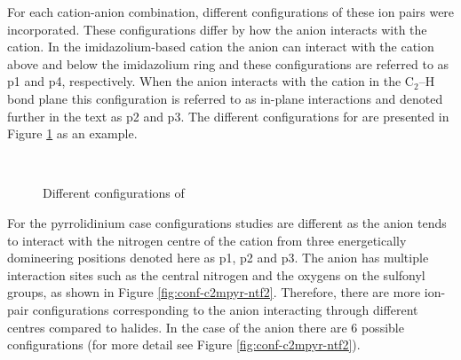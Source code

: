 For each cation-anion combination, different configurations of these ion pairs were incorporated. 
These configurations differ by how the anion interacts with the cation. 
In the imidazolium-based cation  the anion can interact with the cation above and below the imidazolium ring and these configurations are referred to as p1 and p4, respectively.
When the anion interacts with the cation in the $\text{C}_2\text{--H}$ bond plane this configuration is referred to as in-plane interactions and denoted further in the text as p2 and p3.
The different configurations for  are presented in Figure
\protect\ref{fig:conf-c3mim-br}
as an example. 


\begin{figure}
    \centering
    \mbox{
    }
    \mbox{
    }                                 
    \caption{Different configurations of \protect{} \label{fig:conf-c3mim-br}}
\end{figure}

For the pyrrolidinium case configurations studies are different as the anion tends to interact with the nitrogen centre of the cation from three energetically domineering positions denoted here as p1, p2 and p3.
\cite{Izgorodina2014a}
The \ntf anion has multiple interaction sites such as the central nitrogen and the oxygens on the sulfonyl groups, as shown in Figure \ref{fig:conf-c2mpyr-ntf2}.
Therefore, there are more ion-pair configurations corresponding to the anion interacting through different centres compared to halides.
In the case of the \ntf anion there are 6 possible configurations (for more detail see Figure \ref{fig:conf-c2mpyr-ntf2}). 


